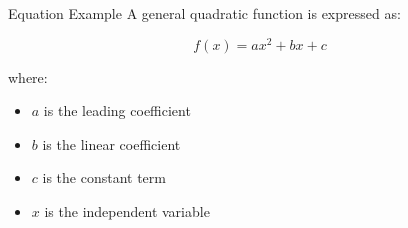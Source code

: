 \begin{frame}{Equation Example}
  A general quadratic function is expressed as:

  \vspace{0.5em}

  \begin{equation}
    f(x) = ax^2 + bx + c
  \end{equation}

  \vspace{0.5em}

  where:
  \begin{itemize}
    \item $a$ is the leading coefficient
    \item $b$ is the linear coefficient
    \item $c$ is the constant term
    \item $x$ is the independent variable
  \end{itemize}
\end{frame}
